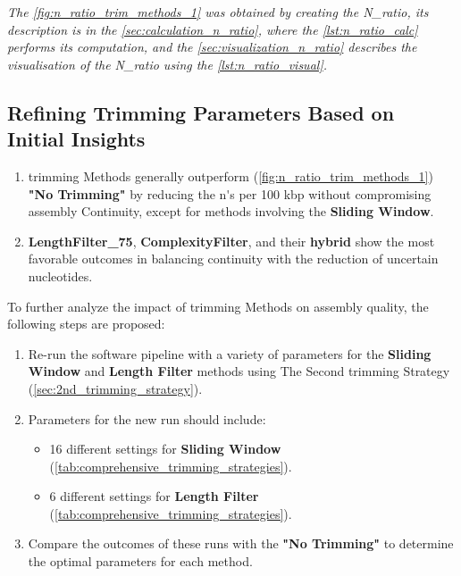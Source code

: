 \textit{The \autoref{fig:n_ratio_trim_methods_1} was obtained by creating the  N\_ratio, its description is in the  \autoref{sec:calculation_n_ratio}, where the \autoref{lst:n_ratio_calc} performs its computation, and the \autoref{sec:visualization_n_ratio} describes the visualisation of the N\_ratio using the \autoref{lst:n_ratio_visual}.}

\subsection{Refining Trimming Parameters Based on Initial Insights} 

\begin{enumerate}
  \item \gls{trimming} Methods generally outperform (\autoref{fig:n_ratio_trim_methods_1}) \textbf{"No Trimming"} by reducing the \gls{n's per 100 kbp} without compromising \gls{assembly} Continuity, except for methods involving the \textbf{Sliding Window}.
  \item \textbf{LengthFilter\_75}, \textbf{ComplexityFilter}, and their \textbf{hybrid} show the most favorable outcomes in balancing continuity with the reduction of uncertain nucleotides.
\end{enumerate}

To further analyze the impact of \gls{trimming} Methods on \gls{assembly} quality, the following steps are proposed:
\begin{enumerate}
  \item Re-run the software pipeline with a variety of parameters for the \textbf{Sliding Window} and \textbf{Length Filter} methods using The Second \gls{trimming} Strategy (\autoref{sec:2nd_trimming_strategy}).
  \item Parameters for the new run should include:
    \begin{itemize}
      \item 16 different settings for \textbf{Sliding Window} (\autoref{tab:comprehensive_trimming_strategies}).
      \item 6 different settings for \textbf{Length Filter} (\autoref{tab:comprehensive_trimming_strategies}).
    \end{itemize}
  \item Compare the outcomes of these runs with the \textbf{"No Trimming"} to determine the optimal parameters for each method.
\end{enumerate}






